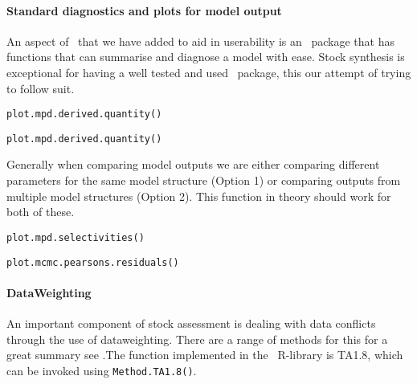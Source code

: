 \paragraph*{Standard diagnostics and plots for model output}
An aspect of \CNAME\ that we have added to aid in userability is an \R\ package that has functions that can summarise and diagnose a model with ease. Stock synthesis is exceptional for having a well tested and used \R\ package, this our attempt of trying to follow suit.

\texttt{plot.mpd.derived.quantity()}

\texttt{plot.mpd.derived.quantity()}

Generally when comparing model outputs we are either comparing different parameters for the same model structure (Option 1) or comparing outputs from multiple model structures (Option 2). This function in theory should work for both of these.

\texttt{plot.mpd.selectivities()}


\texttt{plot.mcmc.pearsons.residuals()}


\paragraph*{DataWeighting}
An important component of stock assessment is dealing with data conflicts through the use of dataweighting. There are a range of methods for this for a great summary see \cite{francis2011data} .The function implemented in the \CNAME\ R-library is TA1.8, which can be invoked using \texttt{Method.TA1.8()}.

